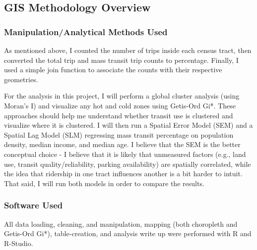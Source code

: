 \documentclass[
]{article}
\begin{document}
\subsection{GIS Methodology Overview}\label{gis-methodology-overview}

\subsubsection{Manipulation/Analytical Methods
Used}\label{manipulationanalytical-methods-used}

As mentioned above, I counted the number of trips inside each census
tract, then converted the total trip and mass transit trip counts to
percentage. Finally, I used a simple join function to associate the
counts with their respective geometries.

For the analysis in this project, I will perform a global cluster
analysis (using Moran's I) and visualize any hot and cold zones using
Getis-Ord Gi*. These approaches should help me understand whether
transit use is clustered and visualize where it is clustered. I will
then run a Spatial Error Model (SEM) and a Spatial Lag Model (SLM)
regressing mass transit percentage on population density, median income,
and median age. I believe that the SEM is the better conceptual choice -
I believe that it is likely that unmeasured factors (e.g., land use,
transit quality/reliability, parking availability) are spatially
correlated, while the idea that ridership in one tract influences
another is a bit harder to intuit. That said, I will run both models in
order to compare the results.

\subsubsection{Software Used}\label{software-used}

All data loading, cleaning, and manipulation, mapping (both choropleth
and Getis-Ord Gi*), table-creation, and analysis write up were performed
with R and R-Studio.
\end{document}

